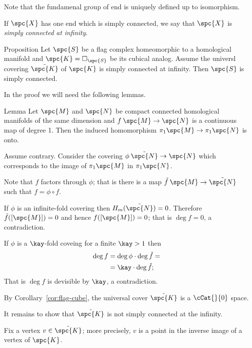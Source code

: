Note that the fundamenal group of end is uniquely defined up to isomorphism.

If $\spc{X}$ has one end which is simply connected,
we say that $\spc{X}$ is \emph{simply connected at infinity}.


\begin{thm}{Proposition}\label{prop:example-pi_infty}
Let $\spc{S}$ be a flag complex homeomorphic to a homological manifold
and $\spc{K}=\square_{\spc{S}}$ be its cubical analog.
Assume the universl covering $\tilde{\spc{K}}$ of $\spc{K}$ is simply connected at infinity.
Then $\spc{S}$ is simply connected.
\end{thm}


In the proof we will need the following lemmas.

\begin{thm}{Lemma}\label{lem:deg=1=>epi-pi1}
Let $\spc{M}$ and $\spc{N}$ be compact connected homological manifolds of the same dimension
and $f\:\spc{M}\to \spc{N}$ is a continuous map of degree 1.
Then the induced homomorphism $\pi_1\spc{M}\to \pi_1\spc{N}$
is onto.
\end{thm}

Assume contrary.
Consider the covering $\phi\:\tilde{\spc{N}}\to \spc{N}$
which corresponds to the image of $\pi_1\spc{M}$
in $\pi_1\spc{N}$.

Note that $f$ factors through $\phi$;
that is there is a map $\tilde f\:\spc{M} \to \tilde{\spc{N}}$
such that $f=\phi\circ f$.



If $\phi$ is an infinite-fold covering then $H_m(\tilde{\spc{N}})=0$.
Therefore $\tilde f([\spc{M}])=0$ 
and hence $f([\spc{M}])=0$;
that is $\deg f=0$, a contradiction.

If $\phi$ is a $\kay$-fold coveing for a finite $\kay>1$
then 
\begin{align*}
\deg f
&=\deg\phi\cdot\deg \tilde f=
\\
&=\kay \cdot \deg \tilde f;
\end{align*}
That is $\deg f$ is devisible by $\kay$,
a contradiction.\qeds

By Corollary~\ref{cor:flag-cube}, the universal cover $\tilde{\spc{K}}$ is a $\cCat{}{0}$ space.

It remains to show that $\tilde{\spc{K}}$ is not simply connected at the infinity.

Fix a vertex $v\in \tilde{\spc{K}}$;
more precisely, $v$ is a point 
in the inverse image of a vertex of $\spc{K}$.

